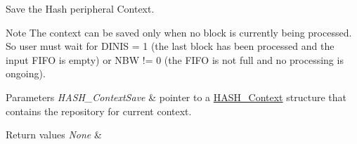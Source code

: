 Save the Hash peripheral Context. 

\begin{DoxyNote}{Note}
The context can be saved only when no block is currently being processed. So user must wait for D\+I\+N\+I\+S = 1 (the last block has been processed and the input F\+I\+F\+O is empty) or N\+B\+W != 0 (the F\+I\+F\+O is not full and no processing is ongoing). 
\end{DoxyNote}

\begin{DoxyParams}{Parameters}
{\em H\+A\+S\+H\+\_\+\+Context\+Save} & pointer to a \hyperlink{struct_h_a_s_h___context}{H\+A\+S\+H\+\_\+\+Context} structure that contains the repository for current context. \\
\hline
\end{DoxyParams}

\begin{DoxyRetVals}{Return values}
{\em None} & \\
\hline
\end{DoxyRetVals}
